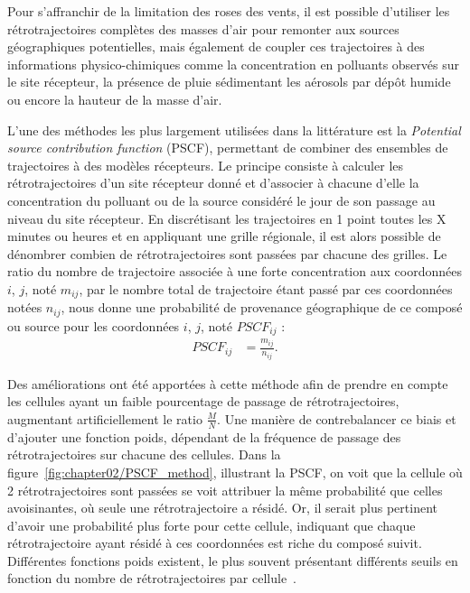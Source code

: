 Pour s'affranchir de la limitation des roses des vents, il est possible d'utiliser les
rétrotrajectoires complètes des masses d'air pour remonter aux sources géographiques
potentielles, mais également de coupler ces trajectoires à des informations
physico-chimiques comme la concentration en polluants observés sur le site récepteur, la
présence de pluie sédimentant les aérosols par dépôt humide ou encore la hauteur de la
masse d'air.

L'une des méthodes les plus largement utilisées dans la littérature est la \textit{Potential
source contribution function} (PSCF), permettant de combiner des ensembles de trajectoires à
des modèles récepteurs. Le principe consiste à calculer les rétrotrajectoires d'un site
récepteur donné et d'associer à chacune d'elle la concentration du polluant ou de la
source considéré le jour de son passage au niveau du site récepteur. En discrétisant les
trajectoires en 1 point toutes les X minutes ou heures et en appliquant une grille
régionale, il est alors possible de dénombrer combien de rétrotrajectoires sont passées par
chacune des grilles.  Le ratio du nombre de trajectoire associée à une forte concentration
aux coordonnées $i$, $j$, noté $m_{ij}$, par le nombre total de trajectoire étant passé
par ces coordonnées notées $n_{ij}$, nous donne une probabilité de provenance géographique
de ce composé ou source pour les coordonnées $i$, $j$, noté $PSCF_{ij}$ :
\begin{align}
    \label{eq:PSCF}
    PSCF_{ij} &= \frac{m_{ij}}{n_{ij}}.
\end{align}

Des améliorations ont été apportées à cette méthode afin de prendre en compte les cellules
ayant un faible pourcentage de passage de rétrotrajectoires, augmentant artificiellement
le ratio $\frac{M}{N}$. Une manière de contrebalancer ce biais et d'ajouter une fonction
poids, dépendant de la fréquence de passage des rétrotrajectoires sur chacune des
cellules. Dans la figure~\ref{fig:chapter02/PSCF_method}, illustrant la PSCF, on voit que
la cellule où 2 rétrotrajectoires sont passées se voit attribuer la même probabilité que
celles avoisinantes, où seule une rétrotrajectoire a résidé. Or, il serait plus pertinent
d'avoir une probabilité plus forte pour cette cellule, indiquant que chaque
rétrotrajectoire ayant résidé à ces coordonnées est riche du composé suivit.  Différentes
fonctions poids existent, le plus souvent présentant différents seuils en fonction du
nombre de rétrotrajectoires par cellule~\autocite{bressiSources2014,petitSources2019}.

